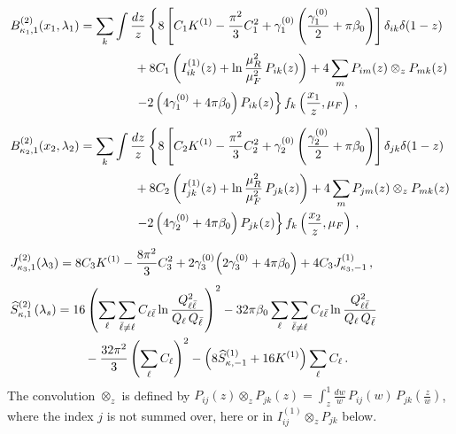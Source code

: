 \begin{subequations}
\label{eq:C21-ingred}
\begin{align}
&B_{\kappa_{1},1}^{(2)}(x_1,\lambda_1) = \sum_{k}\int\frac{dz}{z}
   \left\{8 \left[C_1 K^{(1)}-\frac{\pi^2}{3}C_1^2
    +\gamma_1^{(0)}\left(\frac{\gamma_1^{(0)}}{2}+\pi\beta_0\right)\right]
    \delta_{ik}\delta(1-z) \right.\notag\\[0.5ex]
  &\qquad\qquad\qquad\qquad\qquad+8C_1\left(I_{ik}^{(1)}(z)+\ln\frac{\mu_R^2}{\mu_F^2}\,P_{ik}(z)\right)
    +4\sum_m P_{im}(z)\otimes_z P_{mk}(z)\notag\\
    &\qquad\qquad\qquad\qquad\qquad\left.-2\left(4\gamma_1^{(0)}+4\pi\beta_0\right)P_{ik}(z)\right\}f_k\left(\frac{x_1}{z},\mu_F\right)\,, \\[1.5ex]
&B_{\kappa_{2},1}^{(2)}(x_2,\lambda_2) = \sum_{k}\int\frac{dz}{z}
   \left\{8 \left[C_2 K^{(1)}-\frac{\pi^2}{3}C_2^2
    +\gamma_2^{(0)}\left(\frac{\gamma_2^{(0)}}{2}+\pi\beta_0\right)\right]
    \delta_{jk}\delta(1-z) \right.\notag\\[0.5ex]
  &\qquad\qquad\qquad\qquad\qquad+8C_2\left(I_{jk}^{(1)}(z)+\ln\frac{\mu_R^2}{\mu_F^2}\,P_{jk}(z)\right)
    +4\sum_m P_{jm}(z)\otimes_z P_{mk}(z)\notag\\
    &\qquad\qquad\qquad\qquad\qquad\left.-2\left(4\gamma_2^{(0)}+4\pi\beta_0\right)P_{jk}(z)\right\}f_k\left(\frac{x_2}{z},\mu_F\right)\,, \\[1.5ex]
    &J_{\kappa_3,1}^{(2)}(\lambda_3) = 8C_3 K^{(1)}-\frac{8\pi^2}{3}C_3^2
    +2\gamma_3^{(0)}\!\left(2\gamma_3^{(0)}+4\pi\beta_0\right)
    +4C_3 J_{\kappa_3,-1}^{(1)}\,, \\[1ex]
&\widehat{S}_{\kappa,1}^{(2)}\left(\lambda_s\right) =16\left(\sum_{\ell}\sum_{\bar{\ell}\neq\ell}C_{\ell\bar\ell}\ln\frac{Q_{\ell\bar{\ell}}^2}{Q_{\ell}\,Q_{\bar{\ell}}}\right)^2
-32\pi\beta_0\sum_{\ell}\sum_{\bar{\ell}\neq\ell}C_{\ell\bar\ell}\ln\frac{Q_{\ell\bar{\ell}}^2}{Q_{\ell}\,Q_{\bar{\ell}}}\notag\\
&\qquad\qquad\qquad -\frac{32\pi^2}{3}\left(\sum_{\ell}C_{\ell}\right)^2-\left(8\widehat{S}_{\kappa,-1}^{(1)}+16K^{(1)}\right)\sum_{\ell}C_{\ell}\,.
\end{align}
\end{subequations}
The convolution $\otimes_z$ is defined by
$P_{ij}(z)\otimes_z P_{jk}(z)=\int_z^1\frac{dw}{w}\,P_{ij}(w)\,
  P_{jk}\!\left(\frac{z}{w}\right)$, 
  where the index $j$ is not summed over, here or in
$I_{ij}^{(1)}\otimes_z P_{jk}$ below.

